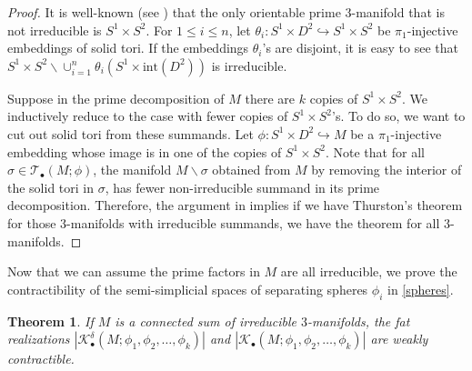 \documentclass[a4paper]{amsart}
\newtheorem{thm}{Theorem}[section]
\theoremstyle{definition}
\theoremstyle{remark}
\numberwithin{equation}{section}
\begin{document}
\begin{proof}
It is well-known (see \cite[Proposition 1.4]{hatcher2000notes}) that the only orientable prime $3$-manifold that is not irreducible is $S^1\times S^2$. For $1\leq i\leq n$, let $\theta_i:S^1\times D^2\hookrightarrow S^1\times S^2$ be  $\pi_1$-injective embeddings of solid tori. If the embeddings $\theta_i$'s are disjoint, it is easy to see that $S^1\times S^2\backslash \cup_{i=1}^{n} \theta_i(S^1\times \text{int}(D^2))$ is irreducible. 

Suppose in the prime decomposition of $M$ there are $k$ copies of $S^1\times S^2$. We inductively reduce to the case with fewer copies of $S^1\times S^2$'s. To do so, we want to cut out solid tori from these summands. Let $\phi: S^1\times D^2\hookrightarrow M$ be a $\pi_1$-injective embedding whose image is in one of the copies of $S^1\times S^2$. Note that for all $\sigma\in \mathcal{T}_{\bullet}(M;\phi)$, the manifold $M\backslash \sigma$ obtained from $M$ by removing the interior of the solid tori in $\sigma$, has fewer non-irreducible summand in its prime decomposition. Therefore, the argument in  implies if we have Thurston's theorem for those $3$-manifolds with irreducible summands, we have the theorem for all $3$-manifolds.
\end{proof}
Now that we can assume the prime factors in $M$ are all irreducible, we prove the contractibility of the semi-simplicial spaces of separating spheres $\phi_i$ in \ref{spheres}.
\begin{thm}\label{primedecomp}
If $M$ is a connected sum of irreducible $3$-manifolds, the fat realizations $|\mathcal{K}^{\delta}_{\bullet}(M;\phi_1,\phi_2,\dots,\phi_k)|$ and $|\mathcal{K}_{\bullet}(M;\phi_1,\phi_2,\dots,\phi_k)|$ are weakly contractible.
\end{thm}
\end{document}
